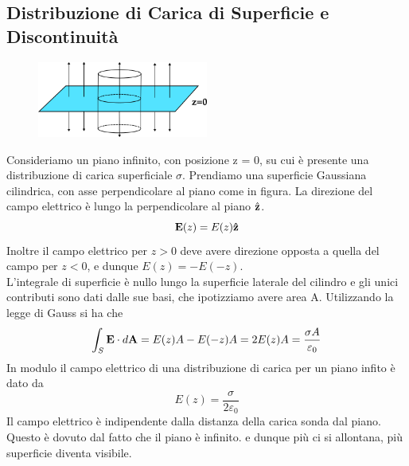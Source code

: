 \subsection{Distribuzione di Carica di Superficie e Discontinuit\`a}

\begin{figure}  %
    \centering
    \includegraphics[width=0.5\textwidth]{images/plane}  %
\end{figure}

Consideriamo un piano infinito, con posizione z = 0, su cui \`e presente una distribuzione di carica superficiale $\sigma$. Prendiamo una superficie Gaussiana cilindrica, con asse perpendicolare al piano come in figura. La direzione del campo elettrico \`e lungo la perpendicolare al piano $\hat{\bold{z}}$. 
\begin{equation*}
	\bold{E}(z) = E(z) \bold{\hat{z}}
\end{equation*}
Inoltre il campo elettrico per $z>0$ deve avere direzione opposta a quella del campo per $z < 0$, e dunque $E(z) = - E(-z)$.
\\

\noindent L'integrale di superficie \`e nullo lungo la superficie laterale del cilindro e gli unici contributi sono dati dalle sue basi, che ipotizziamo avere area A. Utilizzando la legge di Gauss si ha che 
\begin{equation*}
	\int_{S} \bold{E} \cdot d \bold{A} = E(z)A -E(-z)A =2E(z)A = \frac{\sigma A}{\varepsilon_0}
\end{equation*}
In modulo il campo elettrico di una distribuzione di carica per un piano infito \`e dato da 
\begin{equation}
	E(z) = \frac{\sigma}{2\varepsilon_0}
\end{equation}
Il campo elettrico \`e indipendente dalla distanza della carica sonda dal piano. Questo \`e dovuto dal fatto che il piano \`e infinito. e dunque pi\`u ci si allontana, pi\`u superficie diventa visibile.

